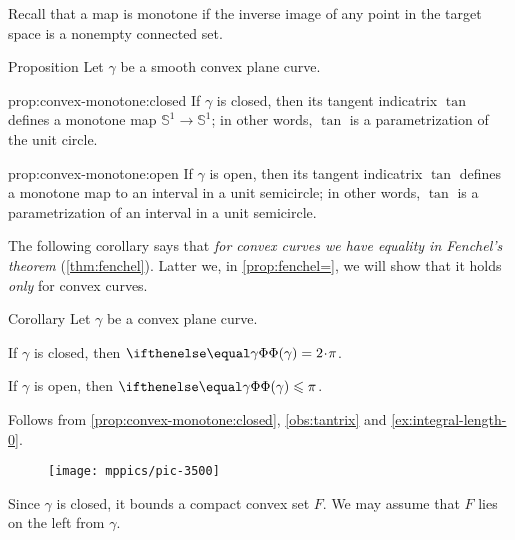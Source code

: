 Recall that a map is monotone if the inverse image of any point in the target space is a nonempty connected set.

\begin{thm}{Proposition}\label{prop:convex-monotone}
Let $\gamma$ be a smooth convex plane curve.

\begin{subthm}{prop:convex-monotone:closed}
If $\gamma$ is closed, then its tangent indicatrix $\tan$ defines a monotone map $\mathbb{S}^1\to \mathbb{S}^1$;
in other words, $\tan$ is a parametrization of the unit circle.
\end{subthm}

\begin{subthm}{prop:convex-monotone:open}
If $\gamma$ is open, then its tangent indicatrix $\tan$ defines a monotone map to an interval in a unit semicircle;
in other words, $\tan$ is a parametrization of an interval in a unit semicircle.
\end{subthm}

\end{thm}

The following corollary says that \textit{for convex curves we have equality in Fenchel's theorem} (\ref{thm:fenchel}).
Latter we, in \ref{prop:fenchel=}, we will show that it holds \textit{only} for convex curves.

\begin{thm}{Corollary}\label{cor:fenchel=convex}
Let $\gamma$ be a convex plane curve.

\begin{subthm}{}
If $\gamma$ is closed, then $\tc\gamma=2\cdot\pi$.
\end{subthm}

\begin{subthm}{}
If $\gamma$ is open, then $\tc\gamma\le\pi$.
\end{subthm}

\end{thm}

Follows from \ref{prop:convex-monotone:closed}, \ref{obs:tantrix} and \ref{ex:integral-length-0}.
\qeds

\begin{wrapfigure}{r}{32 mm}
\vskip-0mm
\centering
\texttt{[image: mppics/pic-3500]}
\vskip0mm
\end{wrapfigure}

Since $\gamma$ is closed, it bounds a compact convex set $F$.
We may assume that $F$ lies on the left from $\gamma$.

